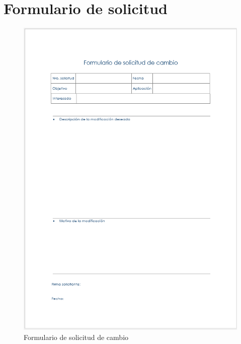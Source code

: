 \section{Formulario de solicitud}
\begin{figure}[H]
    \centering
    \includegraphics[scale=0.80]{Files/solicCambio.PNG}
    \caption{Formulario de solicitud de cambio}
    \label{fig:clases}
\end{figure}

\newpage
